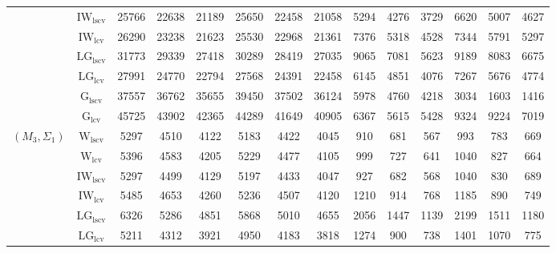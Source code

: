\begin{table}[!ht]
{\begin{tabular}{@{}cc|ccc|ccc|ccc|ccc@{}}
 & $\mathrm{IW}_{\mathrm{lscv}}$ & \cellcolor{black!30}25766 & \cellcolor{black!30}22638 & \cellcolor{black!30}21189 & \cellcolor{black!10}25650 & \cellcolor{black!30}22458 & \cellcolor{black!30}21058 & \cellcolor{black!10}5294 & \cellcolor{black!10}4276 & \cellcolor{black!10}3729 & 6620 & 5007 & 4627 \\ 
 & $\mathrm{IW}_{\mathrm{lcv}}$ & \cellcolor{black!10}26290 & \cellcolor{black!10}23238 & \cellcolor{black!10}21623 & \cellcolor{black!30}25530 & \cellcolor{black!10}22968 & \cellcolor{black!10}21361 & 7376 & 5318 & 4528 & 7344 & 5791 & 5297 \\ 
 & $\mathrm{LG}_{\mathrm{lscv}}$ & 31773 & 29339 & 27418 & 30289 & 28419 & 27035 & 9065 & 7081 & 5623 & 9189 & 8083 & 6675 \\ 
 & $\mathrm{LG}_{\mathrm{lcv}}$ & 27991 & 24770 & 22794 & 27568 & 24391 & 22458 & 6145 & 4851 & 4076 & 7267 & 5676 & 4774 \\ 
 & $\mathrm{G}_{\mathrm{lscv}}$ & 37557 & 36762 & 35655 & 39450 & 37502 & 36124 & 5978 & 4760 & 4218 & \cellcolor{black!30}3034 & \cellcolor{black!30}1603 & \cellcolor{black!30}1416 \\ 
 & $\mathrm{G}_{\mathrm{lcv}}$ & 45725 & 43902 & 42365 & 44289 & 41649 & 40905 & 6367 & 5615 & 5428 & 9324 & 9224 & 7019 \\ 
\midrule
$(M_3,\Sigma_1)$ & $\mathrm{W}_{\mathrm{lscv}}$ & \cellcolor{black!10}5297 & 4510 & \cellcolor{black!10}4122 & \cellcolor{black!10}5183 & \cellcolor{black!10}4422 & \cellcolor{black!10}4045 & 910 & 681 & \cellcolor{black!10}567 & 993 & \cellcolor{black!10}783 & 669 \\ 
 & $\mathrm{W}_{\mathrm{lcv}}$ & 5396 & 4583 & 4205 & 5229 & 4477 & 4105 & 999 & 727 & 641 & 1040 & 827 & \cellcolor{black!10}664 \\ 
 & $\mathrm{IW}_{\mathrm{lscv}}$ & 5297 & \cellcolor{black!10}4499 & 4129 & 5197 & 4433 & 4047 & 927 & 682 & 568 & 1040 & 830 & 689 \\ 
 & $\mathrm{IW}_{\mathrm{lcv}}$ & 5485 & 4653 & 4260 & 5236 & 4507 & 4120 & 1210 & 914 & 768 & 1185 & 890 & 749 \\ 
 & $\mathrm{LG}_{\mathrm{lscv}}$ & 6326 & 5286 & 4851 & 5868 & 5010 & 4655 & 2056 & 1447 & 1139 & 2199 & 1511 & 1180 \\ 
 & $\mathrm{LG}_{\mathrm{lcv}}$ & \cellcolor{black!30}5211 & \cellcolor{black!30}4312 & \cellcolor{black!30}3921 & \cellcolor{black!30}4950 & \cellcolor{black!30}4183 & \cellcolor{black!30}3818 & 1274 & 900 & 738 & 1401 & 1070 & 775 \\ 

\end{tabular}}
\end{table}
